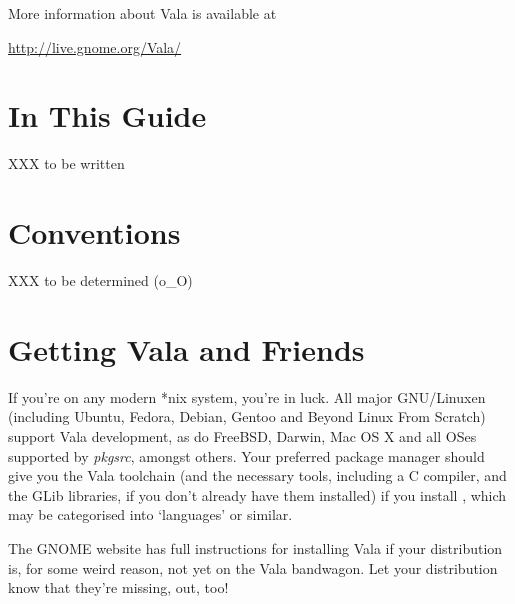 More information about Vala is available at

\hspace{0.25in}\url{http://live.gnome.org/Vala/}

\section{In This Guide}

XXX to be written

\section{Conventions}

XXX to be determined (o\_O)

\section{Getting Vala and Friends}

If you're on any modern *nix system, you're in luck.  All major GNU/Linuxen
(including Ubuntu, Fedora, Debian, Gentoo and Beyond Linux From Scratch)
support Vala development, as do FreeBSD, Darwin, Mac OS X and all OSes
supported by \emph{pkgsrc}, amongst others.  Your preferred package manager
should give you the Vala toolchain (and the necessary tools, including a C
compiler, and the GLib libraries, if you don't already have them installed) if
you install , which may be categorised into `languages' or similar.

The GNOME website has full instructions for installing Vala if your
distribution is, for some weird reason, not yet on the Vala bandwagon.  Let
your distribution know that they're missing, out, too!
